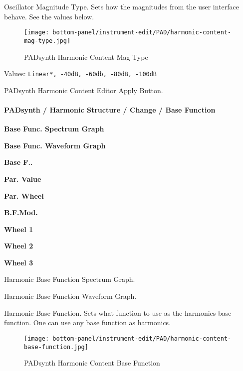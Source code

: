    Oscillator Magnitude Type.
   Sets how the magnitudes from the user interface behave.  See the values
   below.

\begin{figure}[H]
   \centering 
   \texttt{[image: bottom-panel/instrument-edit/PAD/harmonic-content-mag-type.jpg]}
   \caption{PADsynth Harmonic Content Mag Type}
   \label{fig:padsynth_harmonic_content_mag_type}
\end{figure}

   Values: \texttt{Linear*, -40dB, -60db, -80dB, -100dB}

   PADsynth Harmonic Content Editor Apply Button.

\paragraph{PADsynth / Harmonic Structure / Change / Base Function}
\label{paragraph:padsynth_harmonic_structure_change_base_function}

   \begin{enumber}
      \item \textbf{Base Func. Spectrum Graph}
      \item \textbf{Base Func. Waveform Graph}
      \item \textbf{Base F..}
      \item \textbf{Par. Value}
      \item \textbf{Par. Wheel}
      \item \textbf{B.F.Mod.}
      \item \textbf{Wheel 1}
      \item \textbf{Wheel 2}
      \item \textbf{Wheel 3}
   \end{enumber}

   \setcounter{ItemCounter}{0}      %

   Harmonic Base Function Spectrum Graph.

   Harmonic Base Function Waveform Graph.

   Harmonic Base Function.
   Sets what function to use as the harmonics base function.
   One can use any base function as harmonics. 

\begin{figure}[H]
   \centering 
   \texttt{[image: bottom-panel/instrument-edit/PAD/harmonic-content-base-function.jpg]}
   \caption{PADsynth Harmonic Content Base Function}
   \label{fig:padsynth_harmonic_content_base_function}
\end{figure}

